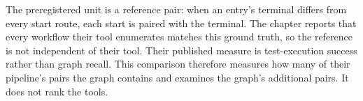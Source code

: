 The preregistered unit is a reference pair: when an entry's terminal differs from every start
route, each start is paired with the terminal. The chapter reports that every
workflow their tool enumerates matches this ground truth, so the reference is not independent of
their tool. Their published measure is
test-execution success rather than graph recall. This comparison therefore measures how many of
their pipeline's pairs the graph contains and examines the graph's additional pairs. It does not
rank the tools.

\newcommand{\rimarow}[2]{#1 & \csname Rima#2Pairs\endcsname & \csname Rima#2HitNoattr\endcsname & \csname Rima#2HitRooted\endcsname & \csname Rima#2HitOutlet\endcsname & \csname Rima#2HitFull\endcsname & \csname Rima#2Extra\endcsname & \csname Rima#2Real\endcsname/\csname Rima#2Judged\endcsname \\}
